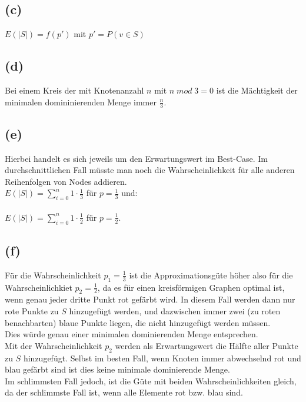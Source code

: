 \documentclass[a4paper]{scrartcl}
\begin{document}
\subsection*{(c)}
$E(|S|) = f(p')$ mit $p' = P(v \in S)$

\subsection*{(d)}
Bei einem Kreis der mit Knotenanzahl $n$ mit $n\;mod\;3=0$ ist die Mächtigkeit der minimalen domininierenden Menge immer $\frac{n}{3}$.



\subsection*{(e)}
Hierbei handelt es sich jeweils um den Erwartungswert im Best-Case. Im durchschnittlichen Fall müsste man noch die Wahrscheinlichkeit für alle anderen Reihenfolgen von Nodes addieren.\\
$E(|S|)  = \sum_{i=0}^{n} 1 \cdot \frac{1}{3}$ %
 für $p = \frac{1}{3}$ und:\\
\\
$E(|S|)  = \sum_{i=0}^{n} 1 \cdot \frac{1}{2}$ für $p = \frac{1}{2}$.


\subsection*{(f)}
Für die Wahrscheinlichkeit $p_1 = \frac{1}{3}$ ist die Approximationsgüte höher also für die Wahrscheinlichkiet $p_2 = \frac{1}{2}$, da es für einen kreisförmigen Graphen optimal ist, wenn genau jeder dritte Punkt rot gefärbt wird. In diesem Fall werden dann nur rote Punkte zu $S$ hinzugefügt werden, und dazwischen immer zwei (zu roten benachbarten) blaue Punkte liegen, die nicht hinzugefügt werden müssen.\\
Dies würde genau einer minimalen dominierenden Menge entsprechen.\\
Mit der Wahrscheinlichkeit $p_2$ werden als Erwartungswert die Hälfte aller Punkte zu $S$ hinzugefügt. Selbst im besten Fall, wenn Knoten immer abwechselnd rot und blau gefärbt sind ist dies keine minimale dominierende Menge.\\
Im schlimmsten Fall jedoch, ist die Güte mit beiden Wahrscheinlichkeiten gleich, da der schlimmste Fall ist, wenn alle Elemente rot bzw. blau sind.
\end{document}
